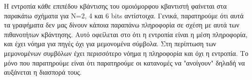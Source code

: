 \documentclass{article}
\begin{document}
\begin{enumerate}
\begin{enumerate}[label=(\roman*)]
            \newpage
            
                \begin{figure}[H]
                \end{figure}
                
                \begin{figure}[H]
                \end{figure}
                
                \begin{figure}[H]
                \end{figure}
            
            \newpage
            
                Η εντροπία κάθε επιπέδου κβάντισης του ομοιόμορφου κβαντιστή φαίνεται στα παρακάτω σχήματα για Ν=2, 4 και 6 bits αντίστοιχα. Γενικά, παρατηρούμε ότι αυτά τα γραφήματα δεν μας δίνουν κάποια παραπάνω πληροφορία σε σχέση με αυτά των πιθανοτήτων κβάντησης. Αυτό οφείλεται στο ότι η εντροπία είναι η μέση πληροφορία, και έχει νόημα για πηγές όχι για μεμονομένα σύμβολα. Στη περίπτωση των μεμονομένων συμβόλων έχει περισσότερο νόημα η πληροφορία και όχι η εντροπία. Το μόνο που παρατηρούμε είναι ότι παρατηρούμε οι κατανομές να "ανοίγουν" δηλαδή να αυξάνεται η διασπορά τους.
                
                \begin{figure}[H]
                \end{figure}
                
                \begin{figure}[H]
                \end{figure}
                
                \begin{figure}[H]
                \end{figure}
            

\end{enumerate}
\end{enumerate}
\end{document}
